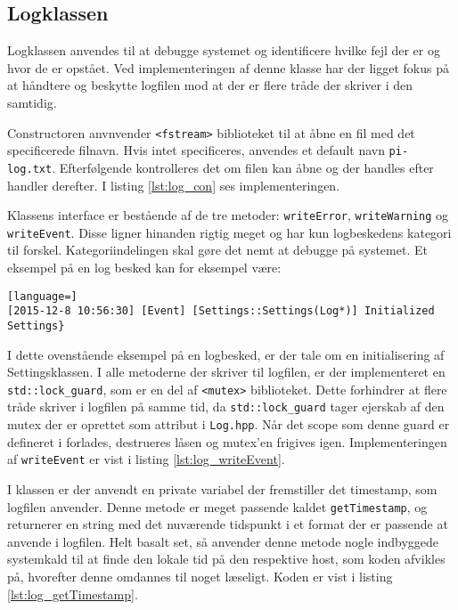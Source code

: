 \subsection{Logklassen}

Logklassen anvendes til at debugge systemet og identificere hvilke fejl der er og hvor de er opstået. Ved implementeringen af denne klasse har der ligget fokus på at håndtere og beskytte logfilen mod at der er flere tråde der skriver i den samtidig.

Constructoren anvnvender \texttt{<fstream>} biblioteket til at åbne en fil med det specificerede filnavn. Hvis intet specificeres, anvendes et default navn \texttt{pi-log.txt}. Efterfølgende kontrolleres det om filen kan åbne og der handles efter handler derefter. I listing \ref{lst:log_con} ses implementeringen.



Klassens interface er bestående af de tre metoder: \texttt{writeError}, \texttt{writeWarning} og \texttt{writeEvent}. 
Disse ligner hinanden rigtig meget og har kun logbeskedens kategori til forskel. 
Kategoriindelingen skal gøre det nemt at debugge på systemet. Et eksempel på en log besked kan for eksempel være:

\begin{lstlisting}[language=]
[2015-12-8 10:56:30] [Event] [Settings::Settings(Log*)] Initialized Settings}
\end{lstlisting}

I dette ovenstående eksempel på en logbesked, er der tale om en initialisering af Settingsklassen.
I alle metoderne der skriver til logfilen, er der implementeret en \texttt{std::lock\_guard}, som er en del af \texttt{<mutex>} biblioteket. 
Dette forhindrer at flere tråde skriver i logfilen på samme tid, da \texttt{std::lock\_guard} tager ejerskab af den mutex der er oprettet som attribut i \texttt{Log.hpp}. 
Når det scope som denne guard er defineret i forlades, destrueres låsen og mutex'en frigives igen. Implementeringen af \texttt{writeEvent} er vist i listing \ref{lst:log_writeEvent}.



\clearpage

I klassen er der anvendt en private variabel der fremstiller det timestamp, som logfilen anvender. Denne metode er meget passende kaldet \texttt{getTimestamp}, og returnerer en string med det nuværende tidspunkt i et format der er passende at anvende i logfilen. Helt basalt set, så anvender denne metode nogle indbyggede systemkald til at finde den lokale tid på den respektive host, som koden afvikles på, hvorefter denne omdannes til noget læseligt. Koden er vist i listing \ref{lst:log_getTimestamp}.

